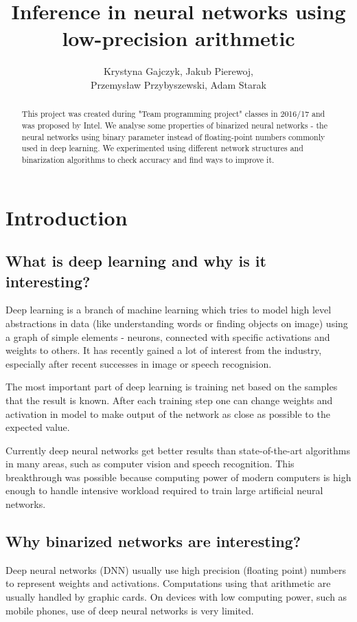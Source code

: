 \documentclass[licencjacka]{pracamgr}
\title{Inference in neural networks using low-precision arithmetic}
\author{Krystyna Gajczyk, Jakub Pierewoj,\\ Przemysław Przybyszewski, Adam Starak}
\begin{document}
\maketitle
\begin{abstract}
This project was created during "Team programming project" classes in 2016/17 and was proposed by Intel. We analyse some properties of binarized neural networks - the neural networks using binary parameter instead of floating-point numbers commonly used in deep learning. We experimented using different network structures and binarization algorithms to check accuracy and find ways to improve it.
\end{abstract}

\tableofcontents

\chapter{Introduction}
	
\section{What is deep learning and why is it interesting?}

Deep learning is a branch of machine learning which tries to model high level abstractions in data (like understanding words or finding objects on image) using a graph of simple elements - neurons, connected with specific activations and weights to others. It has recently gained a lot of interest from the industry, especially after recent successes in image or speech recognision.

The most important part of deep learning is training net based on the samples that the result is known. After each training step one can change weights and activation in model to make output of the network as close as possible to the expected value.

Currently deep neural networks get better results than state-of-the-art algorithms in many areas, such as computer vision and speech recognition. This breakthrough was possible because computing power of modern computers is high enough to handle intensive workload required to train large artificial neural networks.

\section{Why binarized networks are interesting?}
	Deep neural networks (DNN) usually use high precision (floating point) numbers to represent
	weights and activations. Computations using that arithmetic are usually handled by
	graphic cards. On devices with low computing power, such as mobile phones, use of deep neural networks is very limited.
	
\end{document}
